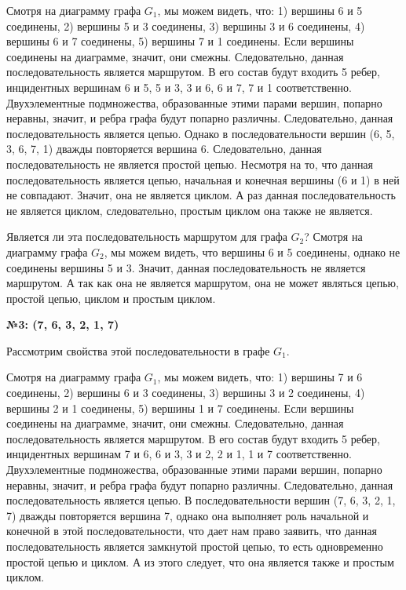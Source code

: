 \documentclass[12pt]{article}
\begin{document}
	Смотря на диаграмму графа $G_1$, мы можем видеть, что: 1) вершины 6 и 5 соединены, 2) вершины 5 и 3 соединены, 3) вершины 3 и 6 соединены, 4) вершины 6 и 7 соединены, 5) вершины 7 и 1 соединены. Если вершины соединены на диаграмме, значит, они смежны. Следовательно, данная последовательность является маршрутом. В его состав будут входить 5 ребер, инцидентных вершинам 6 и 5, 5 и 3, 3 и 6, 6 и 7, 7 и 1 соответственно. Двухэлементные подмножества, образованные этими парами вершин, попарно неравны, значит, и ребра графа будут попарно различны. Следовательно, данная последовательность является цепью. Однако в последовательности вершин (6, 5, 3, 6, 7, 1) дважды повторяется вершина 6. Следовательно, данная последовательность не является простой цепью. Несмотря на то, что данная последовательность является цепью, начальная и конечная вершины (6 и 1) в ней не совпадают. Значит, она не является циклом. А раз данная последовательность не является циклом, следовательно, простым циклом она также не является.
	
	Является ли эта последовательность маршрутом для графа $G_2$? Смотря на диаграмму графа $G_2$, мы можем видеть, что вершины 6 и 5 соединены, однако не соединены вершины 5 и 3. Значит, данная последовательность не является маршрутом. А так как она не является маршрутом, она не может являться цепью, простой цепью, циклом и простым циклом.
	
	{\bf №3: (7, 6, 3, 2, 1, 7)}
	
	Рассмотрим свойства этой последовательности в графе $G_1$.
	
	Смотря на диаграмму графа $G_1$, мы можем видеть, что: 1) вершины 7 и 6 соединены, 2) вершины 6 и 3 соединены, 3) вершины 3 и 2 соединены, 4) вершины 2 и 1 соединены, 5) вершины 1 и 7 соединены. Если вершины соединены на диаграмме, значит, они смежны. Следовательно, данная последовательность является маршрутом. В его состав будут входить 5 ребер, инцидентных вершинам 7 и 6, 6 и 3, 3 и 2, 2 и 1, 1 и 7 соответственно. Двухэлементные подмножества, образованные этими парами вершин, попарно неравны, значит, и ребра графа будут попарно различны. Следовательно, данная последовательность является цепью. В последовательности вершин (7, 6, 3, 2, 1, 7) дважды повторяется вершина 7, однако она выполняет роль начальной и конечной в этой последовательности, что дает нам право заявить, что данная последовательность является замкнутой простой цепью, то есть одновременно простой цепью и циклом. А из этого следует, что она является также и простым циклом.
	
\end{document}
